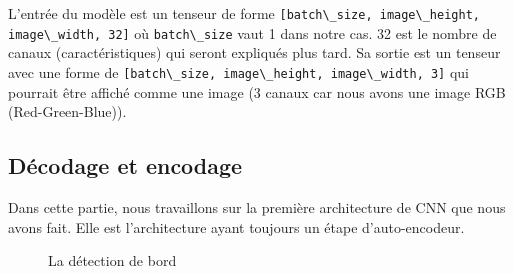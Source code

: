 \documentclass[
  11pt,
  dvipsnames]{article}
\newcommand{\passthrough}[1]{#1}
\begin{document}
L'entrée du modèle est un tenseur de forme \passthrough{\lstinline![batch\_size, image\_height, image\_width, 32]!} où \passthrough{\lstinline!batch\_size!} vaut 1 dans notre cas. 32 est le nombre de canaux (caractéristiques) qui seront expliqués plus tard. Sa sortie est un tenseur avec une forme de \passthrough{\lstinline![batch\_size, image\_height, image\_width, 3]!} qui pourrait être affiché comme une image (3 canaux car nous avons une image RGB (Red-Green-Blue)).

\hypertarget{duxe9codage-et-encodage}{%
\subsection{Décodage et encodage}\label{duxe9codage-et-encodage}}

Dans cette partie, nous travaillons sur la première architecture de CNN que nous avons fait.
Elle est l'architecture ayant toujours un étape d'auto-encodeur.

\begin{figure}

{\centering {}

}

\caption{La détection de bord}\label{fig:compare-with-edge}
\end{figure}
\end{document}
